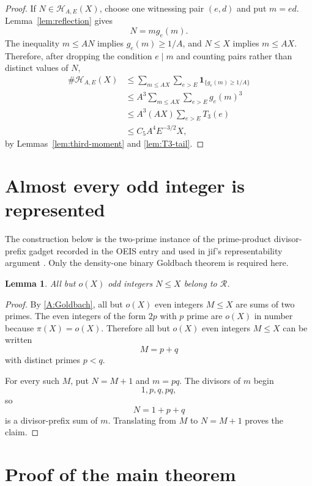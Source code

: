 \documentclass[11pt]{article}
\newtheorem{lemma}[theorem]{Lemma}
\theoremstyle{definition}
\theoremstyle{remark}
\newcommand{\Rset}{\mathscr R}
\newcommand{\indic}{\mathbf 1}
\begin{document}
\begin{proof}
If $N\in\mathcal H_{A,E}(X)$, choose one witnessing pair $(e,d)$ and put $m=ed$.  Lemma~\ref{lem:reflection} gives
\[
N=mg_e(m).
\]
The inequality $m\leq AN$ implies $g_e(m)\geq1/A$, and $N\leq X$ implies $m\leq AX$.  Therefore, after dropping the condition $e\mid m$ and counting pairs rather than distinct values of $N$,
\begin{align*}
\#\mathcal H_{A,E}(X)
&\leq
\sum_{m\leq AX}\sum_{e>E}
\indic_{\{g_e(m)\geq1/A\}}\\
&\leq
A^3\sum_{m\leq AX}\sum_{e>E}g_e(m)^3\\
&\leq
A^3(AX)\sum_{e>E}T_3(e)\\
&\leq C_5A^4E^{-3/2}X,
\end{align*}
by Lemmas~\ref{lem:third-moment} and \ref{lem:T3-tail}.
\end{proof}

\section{Almost every odd integer is represented}

The construction below is the two-prime instance of the prime-product
divisor-prefix gadget recorded in the OEIS entry and used in
jif's representability argument
\cite{OEIS,jif,jifRepo}.  Only the density-one binary
Goldbach theorem is required here.

\begin{lemma}\label{lem:goldbach-represented}
All but $o(X)$ odd integers $N\leq X$ belong to $\Rset$.
\end{lemma}

\begin{proof}
By \ref{A:Goldbach}, all but $o(X)$ even integers $M\leq X$ are sums of two primes.  The even integers of the form $2p$ with $p$ prime are $o(X)$ in number because $\pi(X)=o(X)$.  Therefore all but $o(X)$ even integers $M\leq X$ can be written
\[
M=p+q
\]
with distinct primes $p<q$.

For every such $M$, put $N=M+1$ and $m=pq$.  The divisors of $m$ begin
\[
1,p,q,pq,
\]
so
\[
N=1+p+q
\]
is a divisor-prefix sum of $m$.  Translating from $M$ to $N=M+1$ proves the claim.
\end{proof}

\section{Proof of the main theorem}
\end{document}
